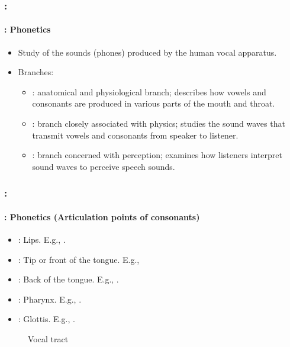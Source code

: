 \documentclass[xcolor=table]{beamer}
\begin{document}
\begin{frame}
	\frametitle{\insertshortsubtitle: \insertsection}
	\framesubtitle{\insertsubsection: Phonetics}

	\begin{itemize}
		\item Study of the sounds (phones) produced by the human vocal apparatus.
		\item Branches:
		\begin{itemize}
			\item {}: anatomical and physiological branch; describes how vowels and consonants are produced in various parts of the mouth and throat.
			\item {}: branch closely associated with physics; studies the sound waves that transmit vowels and consonants from speaker to listener.
			\item {}: branch concerned with perception; examines how listeners interpret sound waves to perceive speech sounds.
		\end{itemize}
	\end{itemize}

\end{frame}

\begin{frame}
	\frametitle{\insertshortsubtitle: \insertsection}
	\framesubtitle{\insertsubsection: Phonetics (Articulation points of consonants)}

	\begin{minipage}{0.55\textwidth}
	\begin{itemize}
		\item {}: Lips. E.g., \expword{\textipa{[b], [p], [m], [f], [v]}}.
		\item {}: Tip or front of the tongue. 
		E.g., 
		\item {}: Back of the tongue. E.g., .
		\item {}: Pharynx. 
		E.g., .
		\item {}: Glottis. 
		E.g., .
	\end{itemize}
	\end{minipage}
	\begin{minipage}{0.43\textwidth}
		\begin{figure}
			\caption{Vocal tract \cite{2009-ball}}
		\end{figure}
	\end{minipage}

\end{frame}
\end{document}
